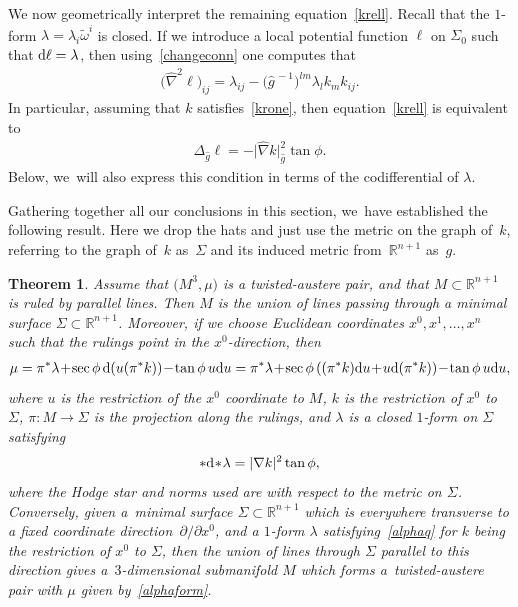 \documentclass[10pt,a4paper]{amsart}
\def\R{\mathbb{R}}
\def\di{\partial}
\def\wt{\tilde\omega}
\def\ghat{\widehat{g}}
\def\hatnabla{\widehat{\nabla}}
\newtheorem{Theorem}{Theorem}[section]
\numberwithin{equation}{section}
\begin{document}
We now geometrically interpret the remaining equation~\eqref{krell}. Recall that the $1$-form $\lambda = \lambda_i \wt^i$ is closed. If we introduce a local potential function $\ell$ on $\Sigma_0$ such that ${\rm d}\ell = \lambda$, then using~\eqref{changeconn} one computes that
\begin{gather*}
\big(\hatnabla^2 \ell\big)_{ij} = \lambda_{ij} -\big(\ghat^{\,-1}\big)^{lm} \lambda_l k_m k_{ij}.
\end{gather*}
In particular, assuming that $k$ satisfies~\eqref{krone}, then equation~\eqref{krell} is equivalent to
\begin{gather*} %
\Delta_{\ghat} \ell = - \big|\hatnabla k\big|^2_{\ghat} \tan \phi.
\end{gather*}
Below, we~will also express this condition in terms of the codifferential of $\lambda$.

Gathering together all our conclusions in this section, we~have established the following result. Here we drop the hats and just use the metric on the graph of~$k$, referring to the graph of~$k$ as~$\Sigma$ and its induced metric from~$\R^{n+1}$ as~$g$.
\begin{Theorem} \label{cylinderthm}
Assume that $\big(M^3,\mu\big)$ is a twisted-austere pair, and that $M \subset \R^{n+1}$ is ruled by parallel lines. Then $M$ is the union of lines passing through a minimal surface $\Sigma \subset \R^{n+1}$. Moreover, if we choose Euclidean coordinates $x^0, x^1, \dots, x^n$ such that the rulings point in the $x^0$-direction, then
\begin{gather}
\mu = \pi^*\lambda \!+\! \sec\phi \, {\rm d} ( u(\pi^* k)) \!-\! \tan\phi \, u {\rm d}u
 = \pi^*\lambda \!+\! \sec\phi \, ( (\pi^* k) {\rm d}u \!+\! u {\rm d} (\pi^* k)) \!-\! \tan\phi \, u {\rm d}u,
\label{alphaform}
\end{gather}
where $u$ is the restriction of the $x^0$ coordinate to $M$, $k$ is the restriction of $x^0$ to $\Sigma$,
$\pi\colon M \to \Sigma$ is the projection along the rulings, and $\lambda$ is a closed $1$-form on $\Sigma$ satisfying
\begin{gather} \label{alphaq}
*{\rm d}\! *\!\lambda = |\nabla k|^2 \tan\phi,
\end{gather}
where the Hodge star and norms used are with respect to the metric on $\Sigma$. Conversely, given a~minimal surface $\Sigma \subset \R^{n+1}$ which is everywhere transverse to a fixed coordinate direc\-tion~$\di/\di x^0$, and a $1$-form $\lambda$ satisfying~\eqref{alphaq} for $k$ being the restriction of $x^0$ to $\Sigma$, then the union of lines through $\Sigma$ parallel to this direction gives a~$3$-dimensional submanifold $M$ which forms a~twisted-austere pair with $\mu$ given by~\eqref{alphaform}.
\end{Theorem}
\end{document}
